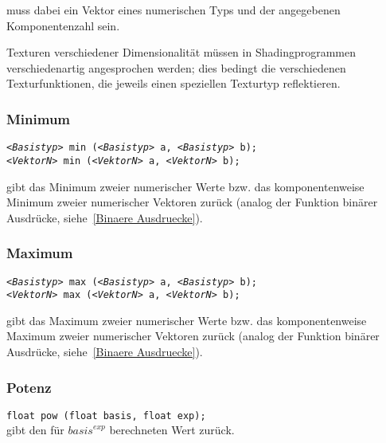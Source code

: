  muss dabei ein Vektor eines numerischen Typs und der angegebenen
Komponentenzahl sein.

Texturen verschiedener
Dimensionalität müssen in Shadingprogrammen verschiedenartig angesprochen werden;
dies bedingt die verschiedenen Texturfunktionen, die jeweils einen speziellen Texturtyp
reflektieren.

\subsubsection{Minimum}

\texttt{\emph{<Basistyp>} min (\emph{<Basistyp>} a, \emph{<Basistyp>} b);}\\
\texttt{\emph{<VektorN>} min (\emph{<VektorN>} a, \emph{<VektorN>} b);}

 gibt das Minimum zweier numerischer Werte bzw. das komponentenweise
Minimum zweier numerischer Vektoren zurück (analog der Funktion binärer Ausdrücke,
siehe~\ref{Binaere Ausdruecke}).

\subsubsection{Maximum}

\texttt{\emph{<Basistyp>} max (\emph{<Basistyp>} a, \emph{<Basistyp>} b);}\\
\texttt{\emph{<VektorN>} max (\emph{<VektorN>} a, \emph{<VektorN>} b);}

 gibt das Maximum zweier numerischer Werte bzw. das komponentenweise
Maximum zweier numerischer Vektoren zurück (analog der Funktion binärer Ausdrücke,
siehe~\ref{Binaere Ausdruecke}).

\subsubsection{Potenz}

\texttt{float pow (float basis, float exp);}\\

 gibt den für $\mathit{basis}^\mathit{exp}$ berechneten Wert zurück.
